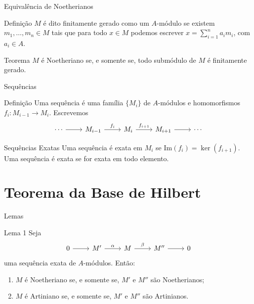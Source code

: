 \documentclass[aspectratio=169]{beamer}
\begin{document}
\begin{frame}{Equivalência de Noetherianos}
	\begin{block}{Definição}
		$M$ é dito finitamente gerado como um $A$-módulo se existem $m_1, \ldots, m_n \in M$ tais que para todo $x \in M$ podemos escrever $x=\sum_{i=1}^{n}a_im_i$, com $a_i \in A$.
	\end{block}

	\begin{block}{Teorema}
		$M$ é Noetheriano se, e somente se, todo submódulo de $M$ é finitamente gerado.
	\end{block}
\end{frame}

\begin{frame}{Sequências}
	\begin{block}{Definição}
		Uma sequência é uma família $\{ M_{i} \}$ de $A$-módulos e homomorfismos $f_{i}:M_{i-1}\to M_{i}$. Escrevemos
		\[
			\begin{tikzcd}[ampersand replacement=\&]
				\cdots \arrow[r] \& M_{i-1} \arrow[r, "{f_{i}}"] \& M_{i} \arrow[r, "{f_{i+1}}"] \& M_{i+1} \arrow[r] \& \cdots
			\end{tikzcd}
		\]
	\end{block}
	\pause
	\begin{alertblock}{Sequências Exatas}
		Uma sequência é exata em $M_{i}$ se $\mathrm{Im}(f_{i})=\ker(f_{i+1})$. Uma sequência é exata se for exata em todo elemento.
	\end{alertblock}
\end{frame}

\section{Teorema da Base de Hilbert}

\begin{frame}{Lemas}
	\begin{block}{Lema 1}
		Seja
		\[
			\begin{tikzcd}[ampersand replacement=\&]
				0 \ar[r] \& M' \ar[r, "{\alpha}"] \& M \ar[r, "{\beta}"] \& M'' \ar[r] \& 0
			\end{tikzcd}
		\]
		uma sequência exata de $A$-módulos. Então:
		\begin{enumerate}
			\item $M$ é Noetheriano se, e somente se, $M'$ e $M''$ são Noetherianos;
			\item $M$ é Artiniano se, e somente se, $M'$ e $M''$ são Artinianos.
		\end{enumerate}
	\end{block}
\end{frame}
\end{document}
